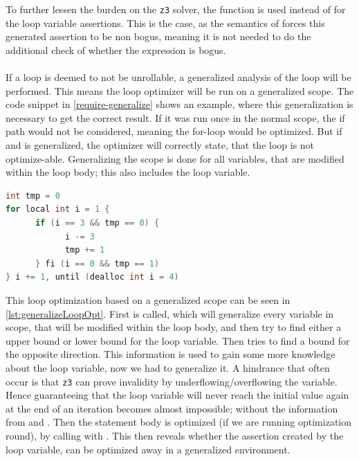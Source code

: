To further lessen the burden on the \texttt{z3}
solver, the function  is used instead of  for the loop
variable assertions. This is the case, as the semantics of \lan forces this generated assertion
to be non bogus, meaning it is not needed to do the additional check of whether the expression
is bogus.
\\
\\
If a loop is deemed to not be unrollable, a generalized analysis of the loop will be performed.
This means the loop optimizer will be run on a generalized scope. The code snippet in
\autoref{require-generalize} shows an example, where this generalization is necessary to get the
correct result. If it was run once in the normal scope, the if path would not be considered,
meaning the for-loop would be optimized. But if  and  is generalized, the
optimizer will correctly state, that the loop is not optimize-able.
Generalizing the scope is done for all variables, that are modified within the loop body;
this also includes the loop variable.

\begin{lstlisting}[language=C++, label=require-generalize, caption=Loop requirering generalization]
int tmp = 0
for local int i = 1 {
      if (i == 3 && tmp == 0) {
            i -= 3
            tmp += 1
      } fi (i == 0 && tmp == 1)
} i += 1, until (dealloc int i = 4)
\end{lstlisting}
\noindent
This loop optimization based on a generalized scope can be seen in
\autoref{lst:generalizeLoopOpt}.
First  is called, which will generalize every variable in scope, that
will be modified within the loop body, and then try to find either a upper bound or lower bound
for the loop variable. Then  tries to find a bound for the opposite
direction. This information is used to gain some more knowledge about the loop variable, now we
had to generalize it. A hindrance that often occur is that \texttt{z3} can prove invalidity by
underflowing/overflowing the variable.
Hence guaranteeing that the loop variable will never reach the initial value again at the end
of an iteration becomes almost impossible; without the information from  and
.
Then the statement body is optimized (if we are running optimization round), 
by calling  with . This then reveals whether the assertion
created by the loop variable, can be optimized away in a generalized environment.

